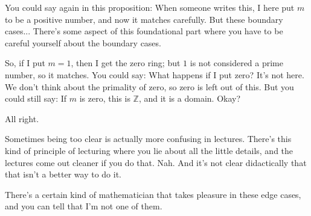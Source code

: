 \begin{speech}[00:21:50 - 00:23:18]
You could say again in this proposition: When someone writes this, I here put $m$ to be a positive number, and now it matches carefully. But these boundary cases... There's some aspect of this foundational part where you have to be careful yourself about the boundary cases.

So, if I put $m = 1$, then I get the zero ring; but $1$ is not considered a prime number, so it matches. You could say: What happens if I put zero? It's not here. We don't think about the primality of zero, so zero is left out of this. But you could still say: If $m$ is zero, this is $\mathbb{Z}$, and it is a domain. Okay?

All right.

Sometimes being too clear is actually more confusing in lectures. There's this kind of principle of lecturing where you lie about all the little details, and the lectures come out cleaner if you do that. Nah. And it's not clear didactically that that isn't a better way to do it. 

There's a certain kind of mathematician that takes pleasure in these edge cases, and you can tell that I'm not one of them.
\end{speech}

\begin{content}
\end{content}

